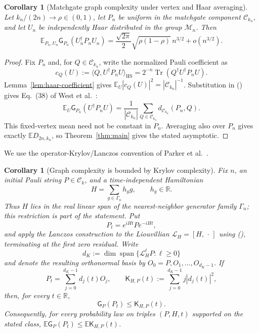 \documentclass[twoside,10pt]{article}
\numberwithin{equation}{section}
\theoremstyle{slbody}
\newtheorem{corollary}[theorem]{Corollary}
\theoremstyle{definition}
\theoremstyle{remark}
\newcommand{\E}{\mathbb{E}}
\newcommand{\1}{\mathbf{1}}
\renewcommand{\eqref}[1]{%
  \textup{{\normalfont(\oldstylenums{\ref{#1}}}\normalfont)}}
\begin{document}
\begin{corollary}[Matchgate graph complexity under vertex and Haar averaging]
\label{cor:complexity}
Let $k_n/(2n)\to\rho\in(0,1)$, let $P_n$ be uniform in the matchgate component
$\mathcal C_{k_n}$, and let $U_n$ be independently Haar distributed in the
group $\mathcal M_n$.  Then
\[
 \E_{P_n,U_n}\mathsf G_{P_n}(U_n^\dagger P_nU_n)
 =\frac{\sqrt{2\pi}}2\sqrt{\rho(1-\rho)}\,n^{3/2}
  +o(n^{3/2}).
\]
\end{corollary}

\begin{proof}
Fix $P_n$ and, for $Q\in\mathcal C_{k_n}$, write the normalized Pauli
coefficient as
\[
 c_Q(U):=\langle Q,U^\dagger P_nU\rangle_{\mathrm{HS}}
 =2^{-n}\operatorname{Tr}(Q^\dagger U^\dagger P_nU).
\]
Lemma~\ref{lem:haar-coefficient} gives
$\E_U|c_Q(U)|^2=|\mathcal C_{k_n}|^{-1}$.  Substitution in
\eqref{eq:graph-complexity-definition} gives Eq.~(38) of West et
al.~\cite[Eq.~(38)]{WestEtAl}:
\[
 \E_U\mathsf G_{P_n}(U^\dagger P_nU)
 =\frac{1}{|\mathcal C_{k_n}|}
   \sum_{Q\in\mathcal C_{k_n}}d_{\mathcal C_{k_n}}(P_n,Q).
\]
This fixed-vertex mean need not be constant in $P_n$.  Averaging also over
$P_n$ gives exactly $\E D_{2n,k_n}$, so
Theorem~\ref{thm:main} gives the stated asymptotic.
\end{proof}

We use the operator-Krylov/Lanczos convention of Parker et
al.~\cite[Section~III, Eqs.~(3)--(8), and Section~V.A,
Eq.~(26)]{ParkerEtAl}.

\begin{corollary}[Graph complexity is bounded by Krylov complexity]\label{cor:krylov}
Fix $n$, an initial Pauli string $P\in\mathcal C_k$, and a time-independent
Hamiltonian
\begin{equation}\label{eq:matchgate-Hamiltonian}
 H=\sum_{g\in\Gamma_n}h_g g,\qquad h_g\in\mathbb R.
\end{equation}
Thus $H$ lies in the real linear span of the nearest-neighbor generator family
$\Gamma_n$; this restriction is part of the statement.
Put
\[
 P_t=e^{iHt}Pe^{-iHt},
\]
and apply the Lanczos construction to the Liouvillian
$\mathcal L_H=[H,\,\cdot\,]$ using \eqref{eq:normalized-HS}, terminating at
the first zero residual.  Write
\[
 d_K:=\dim\operatorname{span}\{\mathcal L_H^\ell P:\ell\geq0\}
\]
and denote the resulting orthonormal basis by
$O_0=P,O_1,\ldots,O_{d_K-1}$.  If
\[
 P_t=\sum_{j=0}^{d_K-1}d_j(t)O_j,
 \qquad
 \mathsf K_{H,P}(t):=\sum_{j=0}^{d_K-1}j|d_j(t)|^2,
\]
then, for every $t\in\mathbb R$,
\[
 \mathsf G_P(P_t)\leq \mathsf K_{H,P}(t).
\]
Consequently, for every probability law on triples $(P,H,t)$ supported on the
stated class, $\E\mathsf G_P(P_t)\leq\E\mathsf K_{H,P}(t)$.
\end{corollary}
\end{document}
